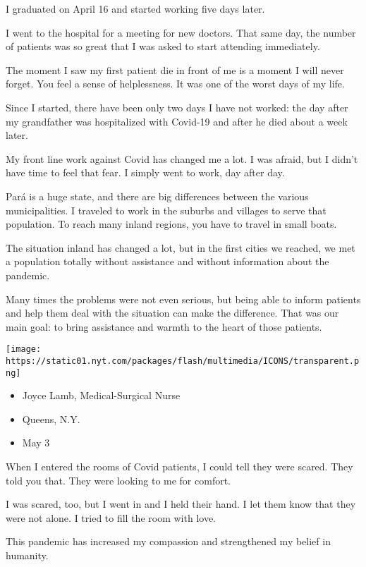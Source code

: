 I graduated on April 16 and started working five days later.

I went to the hospital for a meeting for new doctors. That same day, the
number of patients was so great that I was asked to start attending
immediately.

The moment I saw my first patient die in front of me is a moment I will
never forget. You feel a sense of helplessness. It was one of the worst
days of my life.

Since I started, there have been only two days I have not worked: the
day after my grandfather was hospitalized with Covid-19 and after he
died about a week later.

My front line work against Covid has changed me a lot. I was afraid, but
I didn't have time to feel that fear. I simply went to work, day after
day.

Pará is a huge state, and there are big differences between the various
municipalities. I traveled to work in the suburbs and villages to serve
that population. To reach many inland regions, you have to travel in
small boats.

The situation inland has changed a lot, but in the first cities we
reached, we met a population totally without assistance and without
information about the pandemic.

Many times the problems were not even serious, but being able to inform
patients and help them deal with the situation can make the difference.
That was our main goal: to bring assistance and warmth to the heart of
those patients.

\texttt{[image: https://static01.nyt.com/packages/flash/multimedia/ICONS/transparent.png]}

\begin{itemize}
\tightlist
\item
  Joyce Lamb, Medical-Surgical Nurse
\item
  Queens, N.Y.
\item
  May 3
\end{itemize}

When I entered the rooms of Covid patients, I could tell they were
scared. They told you that. They were looking to me for comfort.

I was scared, too, but I went in and I held their hand. I let them know
that they were not alone. I tried to fill the room with love.

This pandemic has increased my compassion and strengthened my belief in
humanity.

